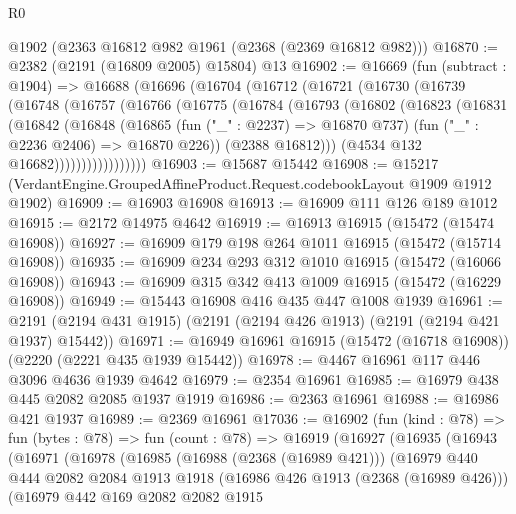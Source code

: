 \begin{lexlean}{R0}
\begin{coremodule}
    @1902
    (@2363 @16812 @982 @1961 (@2368 (@2369 @16812 @982)))
@16870 := @2382 (@2191 (@16809 @2005) @15804) @13
@16902 := @16669
    (fun (subtract : @1904) =>
    @16688
      (@16696
        (@16704
          (@16712
            (@16721
              (@16730
                (@16739
                  (@16748
                    (@16757
                      (@16766
                        (@16775
                          (@16784
                            (@16793
                              (@16802
                                (@16823
                                  (@16831
                                    (@16842
                                      (@16848
                                        (@16865
                                          (fun ("_" : @2237) => @16870 @737)
                                          (fun ("_" : @2236 @2406) => @16870 @226))
                                        (@2388 @16812)))
                                    (@4534 @132 @16682)))))))))))))))))
@16903 := @15687 @15442
@16908 := @15217 (VerdantEngine.GroupedAffineProduct.Request.codebookLayout @1909 @1912 @1902)
@16909 := @16903 @16908
@16913 := @16909 @111 @126 @189 @1012
@16915 := @2172 @14975 @4642
@16919 := @16913 @16915 (@15472 (@15474 @16908))
@16927 := @16909 @179 @198 @264 @1011 @16915 (@15472 (@15714 @16908))
@16935 := @16909 @234 @293 @312 @1010 @16915 (@15472 (@16066 @16908))
@16943 := @16909 @315 @342 @413 @1009 @16915 (@15472 (@16229 @16908))
@16949 := @15443 @16908 @416 @435 @447 @1008 @1939
@16961 := @2191 (@2194 @431 @1915) (@2191 (@2194 @426 @1913) (@2191 (@2194 @421 @1937) @15442))
@16971 := @16949 @16961 @16915 (@15472 (@16718 @16908)) (@2220 (@2221 @435 @1939 @15442))
@16978 := @4467 @16961 @117 @446 @3096 @4636 @1939 @4642
@16979 := @2354 @16961
@16985 := @16979 @438 @445 @2082 @2085 @1937 @1919
@16986 := @2363 @16961
@16988 := @16986 @421 @1937
@16989 := @2369 @16961
@17036 := @16902
    (fun (kind : @78) =>
    fun (bytes : @78) =>
    fun (count : @78) =>
    @16919
      (@16927
        (@16935
          (@16943
            (@16971
              (@16978
                (@16985
                  (@16988 (@2368 (@16989 @421)))
                  (@16979
                    @440
                    @444
                    @2082
                    @2084
                    @1913
                    @1918
                    (@16986 @426 @1913 (@2368 (@16989 @426)))
                    (@16979
                      @442
                      @169
                      @2082
                      @2082
                      @1915

\end{coremodule}
\end{lexlean}
